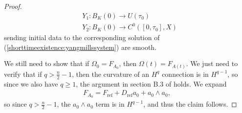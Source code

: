\documentclass[12pt]{amsart}
\renewcommand{\1}{{\mathbf 1}}
\theoremstyle{others}
\numberwithin{equation}{section}
\begin{document}
\begin{proof}
\begin{align}
    &Y_1 : B_K(0) \to U(\tau_0) \\
    &Y_2 : B_K(0) \to C^0([0, \tau_0], X) \label{shorttimeexistence:smoothdependence}
\end{align} sending initial data to the corresponding solution of (\ref{shorttimeexistence:yangmillssystem}) are smooth. \par 
We still need to show that if \(\Omega_0 = F_{A_0}\), then \(\Omega(t) = F_{A(t)}\). We just need to verify that if \(q > \frac{n}{2}-1\), then the curvature of an \(H^q\) connection is in \(H^{q-1}\), so since we also have \(q \geq 1\), the argument in section B.3 of \cite{radethesis} holds. We expand
\begin{align*}
    F_{A_0} = F_{\text{ref}} + D_{\text{ref}}a_0 + a_0 \wedge a_0,
\end{align*} so since \(q > \frac{n}{2}-1\), the \(a_0 \wedge a_0\) term is in \(H^{q-1}\), and thus the claim follows.
 \end{proof}

 

\vspace{5mm}
\end{document}
